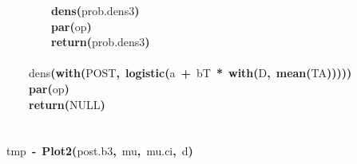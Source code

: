 \documentclass{article}
\makeatletter
\newcommand{\hlfunctioncall}[1]{\textcolor[rgb]{.5,0,.33}{\textbf{#1}}}%
\newcommand{\hlkeyword}[1]{\textbf{#1}}%
\newcommand{\hlassignement}[1]{\textbf{#1}}%
\newcommand{\hlsymbol}[1]{#1}%
\newcommand{\hlstd}[1]{\textcolor[rgb]{0,0,0}{#1}}%
\newenvironment{kframe}{%
 \def\FrameCommand##1{\hskip\@totalleftmargin \hskip-\fboxsep
 \colorbox{shadecolor}{##1}\hskip-\fboxsep
     \hskip-\linewidth \hskip-\@totalleftmargin \hskip\columnwidth}%
 \MakeFramed {\advance\hsize-\width
   \@totalleftmargin\z@ \linewidth\hsize
   \@setminipage}}%
 {\par\unskip\endMakeFramed}
\newenvironment{knitrout}{}{} %
\makeatother
\begin{document}
\begin{knitrout}
{\begin{kframe}
\begin{flushleft}
\hlstd{}{\ }{\ }{\ }{\ }{\ }{\ }{\ }{\ }\hlfunctioncall{dens}\hlkeyword{(}\hlsymbol{prob.dens3}\hlkeyword{)}\hspace*{\fill}\\
\hlstd{}{\ }{\ }{\ }{\ }{\ }{\ }{\ }{\ }\hlfunctioncall{par}\hlkeyword{(}\hlsymbol{op}\hlkeyword{)}\hspace*{\fill}\\
\hlstd{}{\ }{\ }{\ }{\ }{\ }{\ }{\ }{\ }\hlfunctioncall{return}\hlkeyword{(}\hlsymbol{prob.dens3}\hlkeyword{)}\hspace*{\fill}\\
\hlstd{}{\ }{\ }{\ }{\ }\hlkeyword{\usebox{\hlnormalsizeboxclosebrace}}\hspace*{\fill}\\
\hlstd{}{\ }{\ }{\ }{\ }\hlsymbol{dens}\hlfunctioncall{}\hlkeyword{(}\hlfunctioncall{with}\hlkeyword{(}\hlsymbol{POST}\hlkeyword{,}{\ }\hlfunctioncall{logistic}\hlkeyword{(}\hlsymbol{a}{\ }\hlkeyword{+}{\ }\hlsymbol{bT}{\ }\hlkeyword{*}{\ }\hlfunctioncall{with}\hlkeyword{(}\hlsymbol{D}\hlkeyword{,}{\ }\hlfunctioncall{mean}\hlkeyword{(}\hlsymbol{TA}\hlkeyword{)}\hlkeyword{)}\hlkeyword{)}\hlkeyword{)}\hlkeyword{)}\hspace*{\fill}\\
\hlstd{}{\ }{\ }{\ }{\ }\hlfunctioncall{par}\hlkeyword{(}\hlsymbol{op}\hlkeyword{)}\hspace*{\fill}\\
\hlstd{}{\ }{\ }{\ }{\ }\hlfunctioncall{return}\hlkeyword{(}NULL\hlkeyword{)}\hspace*{\fill}\\
\hlstd{}\hlkeyword{\usebox{\hlnormalsizeboxclosebrace}}\hspace*{\fill}\\
\hlstd{}\hspace*{\fill}\\
\hlstd{}\hlsymbol{tmp}{\ }\hlassignement{\usebox{\hlnormalsizeboxlessthan}-}{\ }\hlfunctioncall{Plot2}\hlkeyword{(}\hlsymbol{post.b3}\hlkeyword{,}{\ }\hlsymbol{mu}\hlkeyword{,}{\ }\hlsymbol{mu.ci}\hlkeyword{,}{\ }\hlsymbol{d}\hlkeyword{)}\mbox{}
\normalfont
\end{flushleft}

\end{kframe}}
\end{knitrout}
\end{document}
